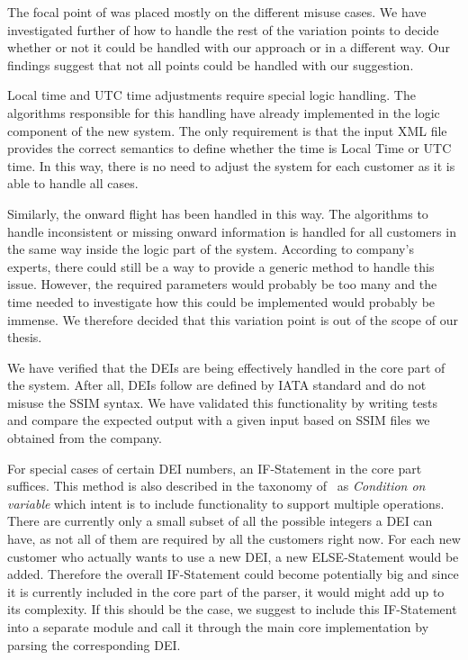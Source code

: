 The focal point of was placed mostly on the different misuse cases. We have investigated further of how to handle the rest of the variation points to decide whether or not it could be handled with our approach or in a different way. Our findings suggest that not all points could be handled with our suggestion. 

Local time and UTC time adjustments require special logic handling. The algorithms responsible for this handling have already implemented in the logic component of the new system. The only requirement is that the input XML file provides the correct semantics to define whether the time is Local Time or UTC time. In this way, there is no need to adjust the system for each customer as it is able to handle all cases.

Similarly, the onward flight has been handled in this way. The algorithms to handle inconsistent or missing onward information is handled for all customers in the same way inside the logic part of the system. According to company's experts, there could still be a way to provide a generic method to handle this issue. However, the required parameters would probably be too many and the time needed to investigate how this could be implemented would probably be immense. We therefore decided that this variation point is out of the scope of our thesis.

We have verified that the DEIs are being effectively handled in the core part of the system. After all, DEIs follow are defined by IATA standard and do not misuse the SSIM syntax. We have validated this functionality by writing tests and compare the expected output with a given input based on SSIM files we obtained from the company. 

For special cases of certain DEI numbers, an IF-Statement in the core part suffices. This method is also described in the taxonomy of~\cite{JillesVanGurp2001} %
as \textit{Condition on variable} which intent is to include functionality to support multiple operations. There are currently only a small subset of all the possible integers a DEI can have, as not all of them are required by all the customers right now. For each new customer who actually wants to use a new DEI, a new ELSE-Statement would be added. Therefore the overall IF-Statement could become potentially big and since it is currently included in the core part of the parser, it would might add up to its complexity. If this should be the case, we suggest to include this IF-Statement into a separate module and call it through the main core implementation by parsing the corresponding DEI. 


